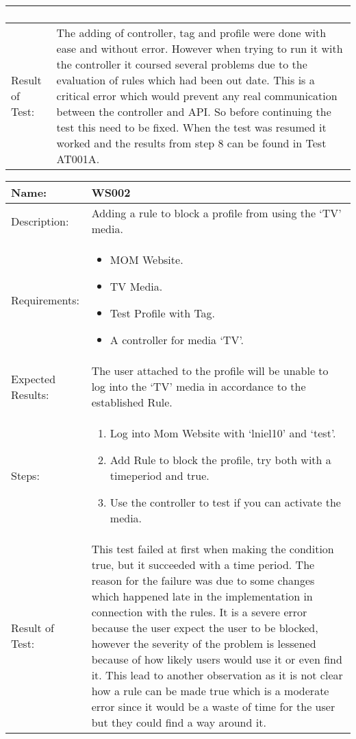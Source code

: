 \begin{table}[h]
\begin{tabular*}{\textwidth}{|l|l|}
{\begin{enumerate}
		\end{enumerate}}
		\\		
		\hline
		Result of Test: & \parbox{.70\textwidth}{The adding of controller, tag and profile were done with ease and without error. However when trying to run it with the controller it coursed several problems due to the evaluation of rules which had been out date. This is a critical error which would prevent any real communication between the controller and API. So before continuing the test this need to be fixed. When the test was resumed it worked and the results from step 8 can be found in Test AT001A.} \\
		\hline
		\end{tabular*}
\end{table}



\begin{table}[h]
	\centering
		\begin{tabular*}{\textwidth}{|l|l|}
		\hline
		\hline
		Name: & WS002\\
		\hline
		Description: & \parbox{0.70\textwidth}{Adding a rule to block a profile from using the `TV' media.}\\
		\hline
		Requirements: & \parbox{0.70\textwidth}{
		\begin{itemize}
			\item MOM Website.
			\item TV Media.
			\item Test Profile with Tag.
			\item A controller for media `TV'.
		\end{itemize}}
		\\
		\hline
		Expected Results: & \parbox{.70\textwidth}{The user attached to the profile will be unable to log into the `TV' media in accordance to the established Rule.}\\
		\hline
		Steps: & \parbox{.70\textwidth}{
		\begin{enumerate}
			\item Log into Mom Website with `lniel10' and `test'.
			\item Add Rule to block the profile, try both with a timeperiod and true.
			\item Use the controller to test if you can activate the media.
		\end{enumerate}}
		\\		
		\hline
		Result of Test: &  \parbox{.70\textwidth}{This test failed at first when making the condition true, but it succeeded with a time period. The reason for the failure was due to some changes which happened late in the implementation in connection with the rules. It is a severe error because the user expect the user to be blocked, however the severity of the problem is lessened because of how likely users would use it or even find it. This lead to another observation as it is not clear how a rule can be made true which is a moderate error since it would be a waste of time for the user but they could find a way around it.}\\
		\hline
		\end{tabular*}
\end{table}


